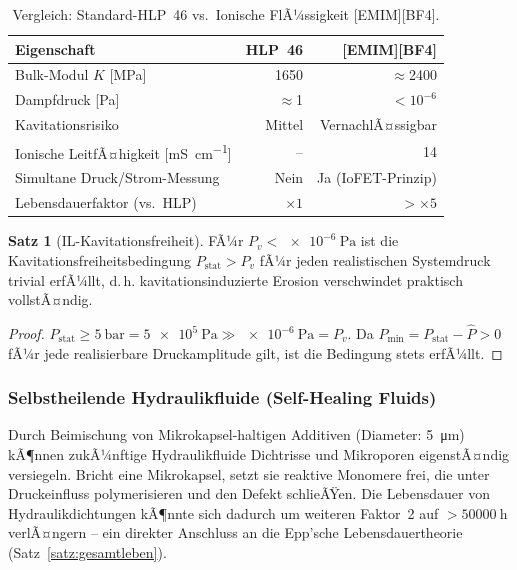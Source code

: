 ﻿\documentclass[a4paper,12pt]{scrreprt}
\theoremstyle{definition}
\newtheorem{satz}{Satz}[section]
\begin{document}
\begin{table}[H]
\centering
\caption{Vergleich: Standard-HLP~46 vs.\ Ionische FlÃ¼ssigkeit [EMIM][BF4].}
\label{tab:il_vergleich}
\small
\begin{tabular}{|l|r|r|}
\hline
\rowcolor{iofetblue!15}
\textbf{Eigenschaft} & \textbf{HLP~46} & \textbf{[EMIM][BF4]} \\
\hline
Bulk-Modul $K$ [\si{\mega\pascal}] & 1650 & $\approx$2400 \\
\hline
Dampfdruck [\si{\pascal}] & $\approx$1 & $< 10^{-6}$ \\
\hline
Kavitationsrisiko & Mittel & VernachlÃ¤ssigbar \\
\hline
Ionische LeitfÃ¤higkeit [\si{\milli\siemens\per\centi\meter}] & -- & 14 \\
\hline
Simultane Druck/Strom-Messung & Nein & Ja (IoFET-Prinzip) \\
\hline
Lebensdauerfaktor (vs.\ HLP) & $\times 1$ & $> \times 5$ \\
\hline
\end{tabular}
\end{table}

\begin{satz}[IL-Kavitationsfreiheit]
\label{satz:il_kavfrei}
FÃ¼r $P_v < \SI{e-6}{\pascal}$ ist die Kavitationsfreiheitsbedingung
$P_{\text{stat}} > P_v$ fÃ¼r jeden realistischen Systemdruck trivial
erfÃ¼llt, d.\,h. kavitationsinduzierte Erosion verschwindet praktisch
vollstÃ¤ndig.
\end{satz}

\begin{proof}
$P_{\text{stat}} \geq \SI{5}{\bar} = \SI{5e5}{\pascal} \gg \SI{e-6}{\pascal} = P_v$.
Da $P_{\min} = P_{\text{stat}} - \hat{P} > 0$ fÃ¼r jede realisierbare
Druckamplitude gilt, ist die Bedingung stets erfÃ¼llt.
\end{proof}

\subsubsection{Selbstheilende Hydraulikfluide (Self-Healing Fluids)}

Durch Beimischung von Mikrokapsel-haltigen Additiven (Diameter: \SI{5}{\micro\meter})
kÃ¶nnen zukÃ¼nftige Hydraulikfluide Dichtrisse und
Mikroporen eigenstÃ¤ndig versiegeln. Bricht eine Mikrokapsel,
setzt sie reaktive Monomere frei, die unter Druckeinfluss
polymerisieren und den Defekt schlieÃŸen. Die Lebensdauer
von Hydraulikdichtungen kÃ¶nnte sich dadurch um weiteren Faktor~2
auf $> \SI{50000}{\hour}$ verlÃ¤ngern -- ein direkter Anschluss
an die Epp'sche Lebensdauertheorie (Satz~\ref{satz:gesamtleben}).
\end{document}
